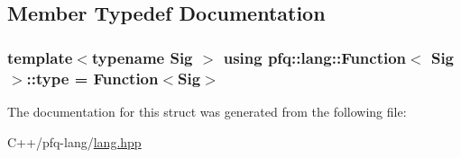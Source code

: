 \subsection{Member Typedef Documentation}
\hypertarget{structpfq_1_1lang_1_1Function_ac7124e473c4804e25b24e9e15fe7b392}{
\subsubsection[{type}]{\setlength{\rightskip}{0pt plus 5cm}template$<$typename Sig $>$ using {\bf pfq\+::lang\+::\+Function}$<$ Sig $>$\+::{\bf type} =  {\bf Function}$<$Sig$>$}}\label{structpfq_1_1lang_1_1Function_ac7124e473c4804e25b24e9e15fe7b392}


The documentation for this struct was generated from the following file\+:\begin{DoxyCompactItemize}
\item 
C++/pfq-\/lang/\hyperlink{lang_8hpp}{lang.\+hpp}\end{DoxyCompactItemize}
